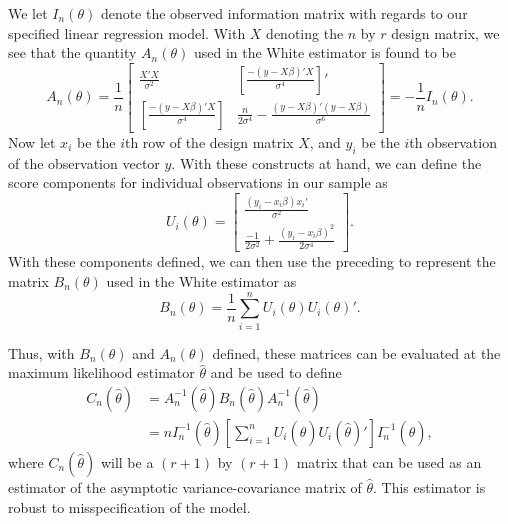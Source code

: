\documentclass[submit]{smj}
\begin{document}
		We let $I_{n} (\theta)$ denote the observed information matrix with regards to our specified linear regression model. With $X$ denoting the $n$ by $r$ design matrix, we see that
		the quantity $A_n (\theta)$ used in the White estimator is found to be 
		\begin{equation*}
			A_n(\theta) = \frac{1}{n}
			\begin{bmatrix}
				\frac{X'X}{\sigma^2} & \left[ \frac{-(y-X\beta)'X}{\sigma^4} \right]' \\
				\left[ \frac{-(y-X\beta)'X}{\sigma^4} \right] &  \frac{n}{2 \sigma^4} - \frac{(y-X\beta)'(y-X\beta)}{\sigma^6}
				\end{bmatrix}
				= -\frac{1}{n} I_n(\theta) .
		\end{equation*}
		Now let $x_i$ be the $i$th row of the design matrix $X$, and $y_i$ be the $i$th observation of the observation vector $y$. With these constructs at hand, we can define the score components
		for individual observations in our sample as
		\begin{equation*}
			U_i(\theta) = 
			\begin{bmatrix}
				\frac{(y_i-x_i \beta)x_i'}{\sigma^2} \\
				\frac{-1}{2 \sigma^2} + \frac{(y_i - x_i \beta)^2}{2 \sigma^4}
			\end{bmatrix}
			.
		\end{equation*}
		With these components defined, we can then use the preceding to represent the matrix $B_n (\theta)$ used in the White estimator as
		\begin{equation*}
			B_n(\theta) = \frac{1}{n} \sum_{i=1}^{n} U_i(\theta) U_i(\theta)' .
		\end{equation*}

		Thus, with $B_n(\theta)$ and $A_n(\theta)$ defined, these matrices can be evaluated at the maximum likelihood estimator $\hat{\theta}$ and be used to define
		\begin{equation*}
			\begin{split}
				C_n(\hat{\theta}) & = A^{-1}_n(\hat{\theta}) B_n(\hat{\theta}) A^{-1}_n(\hat{\theta}) \\
				& = n I_n^{-1}(\hat{\theta}) \left[ \sum_{i=1}^{n} U_i(\hat{\theta}) U_i(\hat{\theta})' \right] I_n^{-1}(\hat{\theta}) ,
			\end{split}
		\end{equation*}
		where $C_n(\hat{\theta})$ will be a $(r+1)$ by $(r+1)$ matrix that can be used as an estimator of the asymptotic variance-covariance matrix of $\hat{\theta}$. This estimator is robust to misspecification
		of the model.
		
\end{document}
